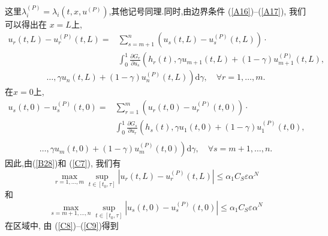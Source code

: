 \documentclass[notitlepage,cs4size,punct,oneside]{ctexrep}
\numberwithin{equation}{chapter}
\theoremstyle{mystyle}
\begin{document}
这里$\lambda_i^{(P)}=\lambda_i(t,x,u^{(P)})$,其他记号同理.同时,由边界条件 (\ref{A16})--(\ref{A17}), 我们可以得出在 $x=L$上,
\begin{equation} \nonumber
    \begin{aligned}
        u_{r}(t, L)-u_{r}^{(P)}(t, L)= & \sum_{s=m+1}^{n}\left(u_{s}(t, L)-u_{s}^{(P)}(t, L)\right) \cdot                                                              \\
                                       & \int_{0}^{1} \frac{\partial G_{r}}{\partial u_{s}}\left(h_{r}(t), \gamma u_{m+1}(t, L)+(1-\gamma) u_{m+1}^{(P)}(t, L),\right.
    \end{aligned}
\end{equation}
\begin{equation}\label{C11}
    \left.\ldots, \gamma u_{n}(t, L)+(1-\gamma) u_{n}^{(P)}(t, L)\right) \mathrm{d} \gamma, \quad \forall r=1, \ldots, m.
\end{equation}
在$x=0$上,
\begin{equation} \nonumber
    \begin{aligned}
        u_{s}(t, 0)-u_{s}^{(P)}(t, 0)= & \sum_{r=1}^{m}\left(u_{r}(t, 0)-u_{r}^{(P)}(t, 0)\right) \cdot                                                            \\
                                       & \int_{0}^{1} \frac{\partial G_{s}}{\partial u_{r}}\left(h_{s}(t), \gamma u_{1}(t, 0)+(1-\gamma) u_{1}^{(P)}(t, 0),\right. \\
    \end{aligned}
\end{equation}
\begin{equation}\label{C12}
    \left.\ldots, \gamma u_{m}(t, 0)+(1-\gamma) u_{m}^{(P)}(t, 0)\right) \mathrm{d} \gamma, \quad \forall s=m+1, \ldots, n .
\end{equation}
因此,由(\ref{B28})和 (\ref{C7}), 我们有
\begin{equation}\label{C13}
    \max _{r=1, \ldots, m} \sup _{t \in\left[t_{0}, \tau\right]}\left|u_{r}(t, L)-u_{r}^{(P)}(t, L)\right| \leq \alpha_{1} C_{S} \varepsilon \alpha^{N}
\end{equation}
和
\begin{equation}\label{C14}
    \max _{s=m+1, \ldots, n} \sup _{t \in\left[t_{0}, \tau\right]}\left|u_{s}(t, 0)-u_{s}^{(P)}(t, 0)\right| \leq \alpha_{1} C_{S} \varepsilon \alpha^{N}
\end{equation}
在区域中, 由 (\ref{C8})--(\ref{C9})得到
\end{document}
